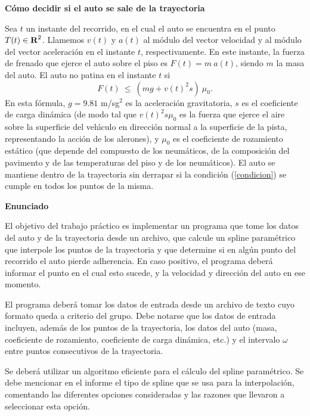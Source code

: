 \documentclass[11pt, a4paper]{article}
\newcommand{\real}{\hbox{\bf R}}
\begin{document}
\vfil \eject

\textbf{C\'omo decidir si el auto se sale de la trayectoria}

Sea $t$ un instante del recorrido, en el cual el auto se encuentra en el
punto $T(t)\in\real^2$. Llamemos $v(t)$ y $a(t)$ al m\'odulo del
vector velocidad y al m\'odulo del vector aceleraci\'on en el instante $t$,
respectivamente. En este instante, la fuerza de frenado que ejerce el auto
sobre el piso es $F(t) = m\: a(t)$, siendo $m$ la masa del auto. El auto
no patina en el instante $t$ si
\begin{equation}
F(t) \ \le\ (mg + v(t)^2s) \: \mu_0. \label{condicion}
\end{equation}
En esta f\'ormula, $g=9.81$ m/sg${}^2$ es la aceleraci\'on gravitatoria,
$s$ es el coeficiente de carga din\'amica (de modo tal que $v(t)^2 s\mu_0$ es
la fuerza que ejerce el aire sobre la superficie del veh\'\i culo en
direcci\'on normal a la superficie de la pista, representando la acci\'on
de los alerones), y $\mu_0$ es el coeficiente de rozamiento est\'atico
(que depende del compuesto de los neum\'aticos, de la composici\'on del
pavimento y de las temperaturas del piso y de los neum\'aticos). El auto
se mantiene dentro de la trayectoria sin derrapar si la condici\'on
(\ref{condicion}) se cumple en todos los puntos de la misma.

\textbf{Enunciado}

El objetivo del trabajo pr\'actico es implementar un programa que tome los
datos del auto y de la trayectoria desde un archivo, que calcule un
spline param\'etrico que interpole los puntos de la trayectoria y que
determine si en alg\'un punto del recorrido el auto pierde adherencia. En
caso positivo, el programa deber\'a informar el punto en el cual esto
sucede, y la velocidad y direcci\'on del auto en ese momento.

El programa deber\'a tomar los datos de entrada desde un archivo de texto
cuyo formato queda a criterio del grupo. Debe notarse que los datos de
entrada incluyen, adem\'as de los puntos de la trayectoria, los datos del
auto (masa, coeficiente de rozamiento, coeficiente de carga din\'amica, etc.)
y el intervalo $\omega$ entre puntos consecutivos de la trayectoria.

Se deber\'a utilizar un algoritmo eficiente para el c\'alculo del spline
param\'etrico. Se debe mencionar en el informe el tipo de spline que se usa
para la interpolaci\'on, comentando las diferentes opciones consideradas
y las razones que llevaron a seleccionar esta opci\'on.
\end{document}
